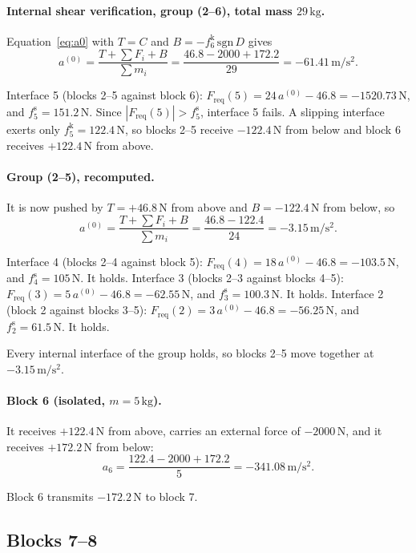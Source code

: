\documentclass[11pt,a4paper]{article}
\begin{document}
\paragraph{Internal shear verification, group (2--6), total mass $29\,\mathrm{kg}$.} Equation~\eqref{eq:a0} with $T=C$ and $B=-f^{\mathrm k}_{6}\,\mathrm{sgn}\,D$ gives\[a^{(0)}=\dfrac{T+\sum F_i+B}{\sum m_i}=\dfrac{46.8 - 2000 + 172.2}{29}=-61.41\,\mathrm{m/s^2}.\]

Interface 5 (blocks 2--5 against block 6): $F_{\mathrm{req}}(5)=24\,a^{(0)} - 46.8=-1520.73\,\mathrm{N}$, and $f^{\mathrm s}_{5}=151.2\,\mathrm{N}$. Since $|F_{\mathrm{req}}(5)|>f^{\mathrm s}_{5}$, interface 5 fails. A slipping interface exerts only $f^{\mathrm k}_{5}=122.4\,\mathrm{N}$, so blocks 2--5 receive $-122.4\,\mathrm{N}$ from below and block 6 receives $+122.4\,\mathrm{N}$ from above.

\paragraph{Group (2--5), recomputed.} It is now pushed by $T=+46.8\,\mathrm{N}$ from above and $B=-122.4\,\mathrm{N}$ from below, so\[a^{(0)}=\dfrac{T+\sum F_i+B}{\sum m_i}=\dfrac{46.8 - 122.4}{24}=-3.15\,\mathrm{m/s^2}.\]

Interface 4 (blocks 2--4 against block 5): $F_{\mathrm{req}}(4)=18\,a^{(0)} - 46.8=-103.5\,\mathrm{N}$, and $f^{\mathrm s}_{4}=105\,\mathrm{N}$. It holds. Interface 3 (blocks 2--3 against blocks 4--5): $F_{\mathrm{req}}(3)=5\,a^{(0)} - 46.8=-62.55\,\mathrm{N}$, and $f^{\mathrm s}_{3}=100.3\,\mathrm{N}$. It holds. Interface 2 (block 2 against blocks 3--5): $F_{\mathrm{req}}(2)=3\,a^{(0)} - 46.8=-56.25\,\mathrm{N}$, and $f^{\mathrm s}_{2}=61.5\,\mathrm{N}$. It holds.

Every internal interface of the group holds, so blocks 2--5 move together at $-3.15\,\mathrm{m/s^2}$.

\paragraph{Block 6 (isolated, $m=5\,\mathrm{kg}$).} It receives $+122.4\,\mathrm{N}$ from above, carries an external force of $-2000\,\mathrm{N}$, and it receives $+172.2\,\mathrm{N}$ from below:\[a_{6}=\dfrac{122.4 - 2000 + 172.2}{5}=-341.08\,\mathrm{m/s^2}.\]

Block 6 transmits $-172.2\,\mathrm{N}$ to block 7.

\subsection{Blocks 7--8}
\end{document}
